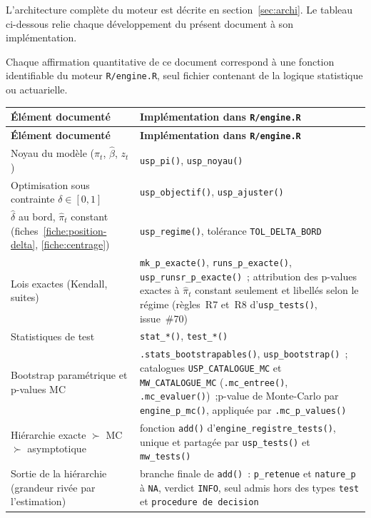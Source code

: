 \documentclass[a4paper,11pt]{article}
\newcommand{\code}[1]{\texttt{\small #1}}
\begin{document}
\noindent
L'architecture complète du moteur est décrite en section~\ref{sec:archi}.
Le tableau ci-dessous relie chaque développement du présent document à son
implémentation.


Chaque affirmation quantitative de ce document correspond à une fonction
identifiable du moteur \code{R/engine.R}, seul fichier contenant de la logique
statistique ou actuarielle.

{\small
\begin{longtable}{@{}p{5.6cm}p{9.4cm}@{}}
\toprule
\textbf{Élément documenté} & \textbf{Implémentation dans \code{R/engine.R}} \\
\midrule
\endfirsthead
\toprule
\textbf{Élément documenté} & \textbf{Implémentation dans \code{R/engine.R}} \\
\midrule
\endhead
Noyau du modèle ($\pi_t$, $\hat\beta$, $z_t$) & \code{usp\_pi()}, \code{usp\_noyau()} \\
Optimisation sous contrainte $\delta\in[0,1]$ & \code{usp\_objectif()}, \code{usp\_ajuster()} \\
$\hat\delta$ au bord, $\hat\pi_t$ constant (fiches~\ref{fiche:position-delta}, \ref{fiche:centrage}) & \code{usp\_regime()}, tolérance \code{TOL\_DELTA\_BORD} \\
Lois exactes (Kendall, suites) & \code{mk\_p\_exacte()}, \code{runs\_p\_exacte()},
\code{usp\_runsr\_p\_exacte()}~; attribution des p-values exactes à $\hat\pi_t$ constant seulement
et libellés selon le régime (règles~R7 et~R8 d'\code{usp\_tests()}, issue~\#70) \\
Statistiques de test & \code{stat\_*()}, \code{test\_*()} \\
Bootstrap paramétrique et p-values MC & \code{.stats\_bootstrapables()}, \code{usp\_bootstrap()}~;\newline
catalogues \code{USP\_CATALOGUE\_MC} et \code{MW\_CATALOGUE\_MC} (\code{.mc\_entree()},
\code{.mc\_evaluer()})~;\newline p-value de Monte-Carlo par \code{engine\_p\_mc()}, appliquée par
\code{.mc\_p\_values()} \\
Hiérarchie exacte $\succ$ MC $\succ$ asymptotique & fonction \code{add()}
d'\code{engine\_registre\_tests()}, unique et partagée par \code{usp\_tests()} et
\code{mw\_tests()} \\
Sortie de la hiérarchie (grandeur rivée par l'estimation) & branche finale de \code{add()}~:
\code{p\_retenue} et \code{nature\_p} à \code{NA}, verdict \code{INFO}, seul admis
hors des types \code{test} et \code{procedure de decision} \\

\end{longtable}}
\end{document}
